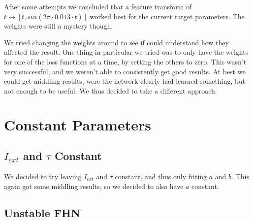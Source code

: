 \documentclass[a4paper]{article}
\begin{document}
After some attempts we concluded that a feature transform of $t \rightarrow \left[ t, sin(2 \pi \cdot 0.013 \cdot t) \right]$ worked best for the current target parameters. The weights were still a mystery though. 

We tried changing the weights around to see if could understand how they affected the result. One thing in particular we tried was to only have the weights for one of the loss functions at a time, by setting the others to zero. This wasn't very successful, and we weren't able to consistently get good results. At best we could get middling results, were the network clearly had learned something, but not enough to be useful. We thus decided to take a different approach.



\section{Constant Parameters}

\subsection{$I_{ext}$ and $\tau$ Constant}

We decided to try leaving $I_{ext}$ and $\tau$ constant, and thus only fitting $a$ and $b$. This again got some middling results, so we decided to also have $a$ constant.

\subsection{Unstable FHN}
\end{document}
